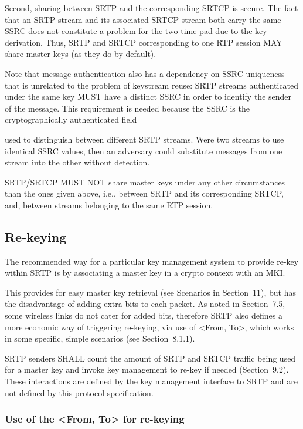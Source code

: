 \documentclass{article}
\begin{document}
Second, sharing between SRTP and the corresponding SRTCP is secure. The fact that an SRTP stream and its associated SRTCP stream both carry the same SSRC does not constitute a problem for the two-time pad due to the key derivation.  Thus, SRTP and SRTCP corresponding to one RTP session MAY share master keys (as they do by default).

Note that message authentication also has a dependency on SSRC uniqueness that is unrelated to the problem of keystream reuse: SRTP streams authenticated under the same key MUST have a distinct SSRC in order to identify the sender of the message.  This requirement is needed because the SSRC is the cryptographically authenticated field

used to distinguish between different SRTP streams.  Were two streams to use identical SSRC values, then an adversary could substitute messages from one stream into the other without detection.

SRTP/SRTCP MUST NOT share master keys under any other circumstances than the ones given above, i.e., between SRTP and its corresponding SRTCP, and, between streams belonging to the same RTP session.

\subsection{Re-keying}

The recommended way for a particular key management system to provide re-key within SRTP is by associating a master key in a crypto context with an MKI.

This provides for easy master key retrieval (see Scenarios in Section~11), but has the disadvantage of adding extra bits to each packet. As noted in Section~7.5, some wireless links do not cater for added bits, therefore SRTP also defines a more economic way of triggering re-keying, via use of <From, To>, which works in some specific, simple scenarios (see Section~8.1.1).

SRTP senders SHALL count the amount of SRTP and SRTCP traffic being used for a master key and invoke key management to re-key if needed (Section~9.2).  These interactions are defined by the key management interface to SRTP and are not defined by this protocol specification.

\subsubsection{Use of the <From, To> for re-keying}
\end{document}
